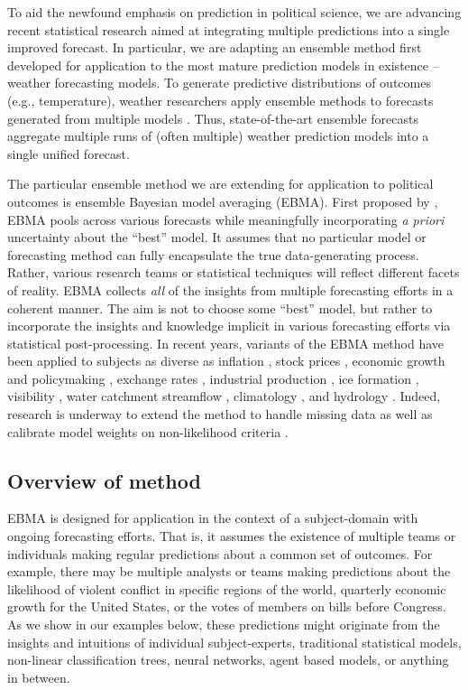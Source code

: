 \documentclass[12pt,fullpage,endnotes]{article}
\begin{document}
To aid the newfound emphasis on prediction in political science, we
are advancing recent statistical research aimed at integrating
multiple predictions into a single improved forecast.  In particular,
we are adapting an ensemble method first developed for application to
the most mature prediction models in existence -- weather forecasting
models.  To generate predictive distributions of outcomes (e.g.,
temperature), weather researchers apply ensemble methods to forecasts
generated from multiple models \citep{Raftery:2005}.  Thus,
state-of-the-art ensemble forecasts aggregate multiple runs of (often
multiple) weather prediction models into a single unified forecast.

The particular ensemble method we are extending for application to
political outcomes is ensemble Bayesian model averaging (EBMA). First
proposed by \citet{Raftery:2005}, EBMA pools across various forecasts
while meaningfully incorporating \textit{a priori} uncertainty about
the ``best'' model.  It assumes that no particular model or
forecasting method can fully encapsulate the true data-generating
process.  Rather, various research teams or statistical techniques
will reflect different facets of reality. EBMA collects \textit{all}
of the insights from multiple forecasting efforts in a coherent
manner.  The aim is not to choose some ``best'' model, but rather to
incorporate the insights and knowledge implicit in various forecasting
efforts via statistical post-processing.  In recent years, variants of
the EBMA method have been applied to subjects as diverse as inflation
\citep{Wright:2009, Koop:2010, Gneiting:2010}, stock prices
\citep{Billio:2011}, economic growth and policymaking
\citep{Brock:2007, Billio:2010}, exchange rates \citep{Wright:2008},
industrial production \citep{Feldkircher:2010}, ice formation
\citep{Berrocal:2010}, visibility \citep{Chmielecki:2010}, water
catchment streamflow \citep{Viney:2009}, climatology \citep{Min:2006,
  Min:2007, Smith:2009}, and hydrology \citep{Zhang:2009}.  Indeed,
research is underway to extend the method to handle missing data
\citep{Fraley:2010, Mccandless:2011} as well as calibrate model
weights on non-likelihood criteria \citep[e.g.,][]{Vrugt:2006}.



\subsection{Overview of method}

EBMA is designed for application in the context of a subject-domain
with ongoing forecasting efforts.  That is, it assumes the existence
of multiple teams or individuals making regular predictions about a
common set of outcomes.  For example, there may be multiple analysts
or teams making predictions about the likelihood of violent conflict
in specific regions of the world, quarterly economic growth for the
United States, or the votes of members on bills before Congress.  As
we show in our examples below, these predictions might originate from
the insights and intuitions of individual subject-experts, traditional
statistical models, non-linear classification trees, neural networks,
agent based models, or anything in between. 
\end{document}
